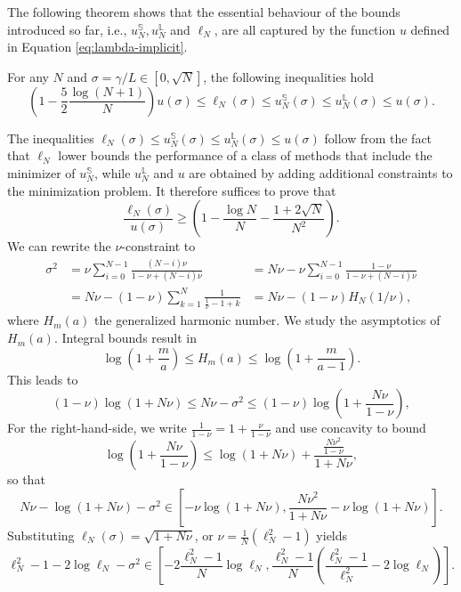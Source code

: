 \documentclass{article}
\begin{document}
The following theorem shows that the essential behaviour of the bounds introduced so far, i.e., $u_N^{\mathbb S},u_N^{\mathbb L}$ and $\ell_N$, are all captured by the function $u$ defined in Equation \eqref{eq:lambda-implicit}.
\begin{theorem}\label{thm:squeeze}
    For any $N$ and $\sigma=\gamma/L\in[0,\sqrt{N}]$, the following inequalities hold
    \[
    \left(1-\frac52\frac{\log (N+1)}{N}\right)u(\sigma)\le \ell_N(\sigma)\le u_N^{\mathbb S}(\sigma)\le u_N^{\mathbb L}(\sigma)\le u(\sigma).
    \]
\end{theorem}
\begin{appendixproof}
The inequalities $\ell_N(\sigma)\le u_N^{\mathbb S}(\sigma)\le u_N^{\mathbb L}(\sigma)\le u(\sigma)$ follow from the fact that $\ell_N$ lower bounds the performance of a class of methods that include the minimizer of $u^{\mathbb S}_N$, while $u^{\mathbb L}_N$ and $u$ are obtained by adding additional constraints to the minimization problem. It therefore suffices to prove that
    \[
    \frac{\ell_N(\sigma)}{u(\sigma)}\ge\left(1-\frac{\log N}{N}-\frac{1+2\sqrt{N}}{N^2}\right).
    \]
    We can rewrite the $\nu$-constraint to
\begin{eqnarray}
\sigma^2
&=\nu \sum_{i=0}^{N-1}  \frac{(N-i)\nu}{1-\nu+(N-i)\nu}\nonumber
&=N\nu-\nu\sum_{i=0}^{N-1}  \frac{1-\nu}{1-\nu+(N-i)\nu}\nonumber\\
&=N\nu-(1-\nu)\sum_{k=1}^{N}  \frac{1}{\frac1\nu-1+k}
&=N\nu-(1-\nu)H_{N}(1/\nu)\label{eq:nu-implicit},
\end{eqnarray}
where $H_m(a)$ the generalized harmonic number. 
We study the asymptotics of $H_m(a)$. Integral bounds result in
\[
\log\left(1+\frac{m}{a}\right)\le H_m(a)\le \log\left(1+\frac{m}{a-1}\right).
\]
This leads to
\[
(1-\nu)\log(1+N\nu)\le N\nu-\sigma^2\le(1-\nu)\log\left(1+\frac{N\nu}{1-\nu}\right),
\]
For the right-hand-side, we write $\frac1{1-\nu}=1+\frac{\nu}{1-\nu}$ and use concavity to bound
\[
\log\left(1+\frac{N\nu}{1-\nu}\right)\le \log\left(1+N\nu\right)+\frac{\frac{N\nu^2}{1-\nu}}{1+N\nu},
\]
so that
\[
N\nu-\log(1+N\nu)-\sigma^2\in\left[-\nu\log(1+N\nu),\frac{N\nu^2}{1+N\nu}-\nu\log(1+N\nu)\right].
\]
Substituting $\ell_N(\sigma)=\sqrt{1+N\nu}$, or $\nu=\frac1N(\ell_N^2-1)$ yields
\[
\ell_N^2-1-2\log\ell_N-\sigma^2\in\left[-2\frac{\ell_N^2-1}N\log\ell_N,\frac{\ell_N^2-1}{N}\left(\frac{\ell_N^2-1}{\ell_N^2}-2\log\ell_N\right)\right].
\]
\end{appendixproof}
\end{document}

